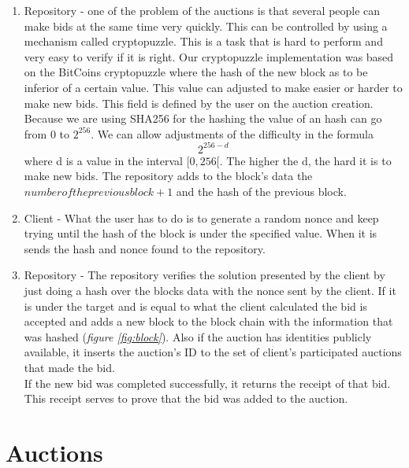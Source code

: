 \documentclass[12pt]{article}
\begin{document}
\begin{enumerate}
    \item Repository - one of the problem of the auctions is that several people can make bids at the same
      \label{itm:cryptopuzzle}
      time very quickly. This can be controlled by using a mechanism called cryptopuzzle. This is a task that 
      is hard to perform and very easy to verify if it is right. Our cryptopuzzle implementation was 
      based on the BitCoins cryptopuzzle where the hash of the new block as to be inferior of a certain 
      value. This value can adjusted to make easier or harder to make new bids. This field is defined 
      by the user on the auction creation. Because we are using SHA256 for the hashing the value of 
      an hash can go from 0 to \(2^{256}\). We can allow adjustments of the difficulty in the formula
      \[2^{256-d}\]
      where d is a value in the interval \([0,256[\). The higher the d, the hard it is to make new bids.
      The repository adds to the block's data the \(number of the previous block + 1\) and the hash of the 
      previous block.

    \item Client - What the user has to do is to generate a random nonce and keep trying until the hash 
      of the block is under the specified value. When it is sends the hash and nonce found to the repository.

    \item Repository - The repository verifies the solution presented by the client by just doing a hash
      over the blocks data with the nonce sent by the client. If it is under the target and is equal to
      what the client calculated the bid is accepted and adds a new block to the block chain with the 
      information that was hashed (\textit{figure \ref{fig:block}}). Also if the auction has identities publicly 
      available, it inserts the auction's ID to the set of client's participated auctions that made the bid.\\
      If the new bid was completed successfully, it returns the receipt of that bid. This receipt serves to prove that
      the bid was added to the auction. 

\end{enumerate}

\section{Auctions}
\end{document}
